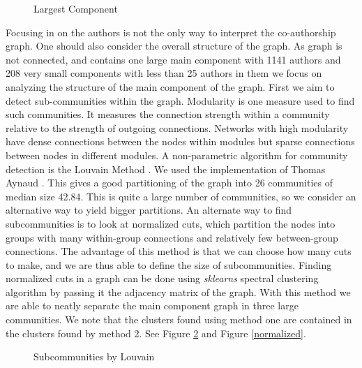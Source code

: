 \documentclass[article,twocolumn]{IEEEtran}
\begin{document}
    \begin{figure}
        \begin{center}\end{center}
        \caption{Largest Component}
        \label{author_collab_large}
    \end{figure}
    
    Focusing in on the authors is not the only way to interpret the
co-authorship graph. One should also consider the overall structure of
the graph. As graph is not connected, and contains one large main
component with 1141 authors and 208 very small components with less than
25 authors in them we focus on analyzing the structure of the main
component of the graph. First we aim to detect sub-communities within
the graph. Modularity is one measure used to find such communities. It
measures the connection strength within a community relative to the
strength of outgoing connections. Networks with high modularity have
dense connections between the nodes within modules but sparse
connections between nodes in different modules. A non-parametric
algorithm for community detection is the Louvain Method
\cite{blondel2008fast}. We used the implementation of Thomas Aynaud
\cite{louvain}. This gives a good partitioning of the graph into 26
communities of median size 42.84. This is quite a large number of
communities, so we consider an alternative way to yield bigger
partitions. An alternate way to find subcommunities is to look at
normalized cuts, which partition the nodes into groups with many
within-group connections and relatively few between-group connections.
The advantage of this method is that we can choose how many cuts to
make, and we are thus able to define the size of subcommunities. Finding
normalized cuts in a graph can be done using \emph{sklearns} spectral
clustering algorithm by passing it the adjacency matrix of the graph.
With this method we are able to neatly separate the main component graph
in three large communities. We note that the clusters found using method
one are contained in the clusters found by method 2. See Figure
\ref{Louvain} and Figure \ref{normalized}.


    \begin{figure}
        \begin{center}\end{center}
        \caption{Subcommunities by Louvain}
        \label{Louvain}
    \end{figure}
    
\end{document}
